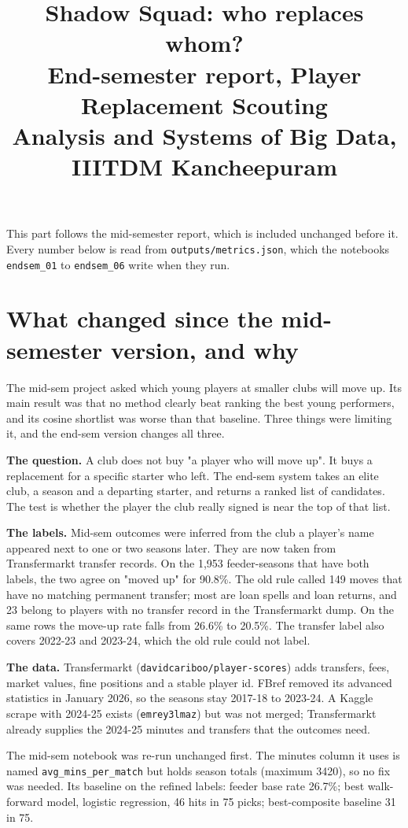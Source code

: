 \documentclass[11pt,a4paper]{article}
\title{Shadow Squad: who replaces whom?\\[4pt]\large End-semester report, Player Replacement Scouting\\Analysis and Systems of Big Data, IIITDM Kancheepuram}\date{}
\begin{document}
\sloppy\maketitle
\noindent This part follows the mid-semester report, which is included unchanged before it. Every number below is read from \texttt{outputs/metrics.json}, which the notebooks \texttt{endsem\_01} to \texttt{endsem\_06} write when they run.

\section{What changed since the mid-semester version, and why}
The mid-sem project asked which young players at smaller clubs will move up. Its main result was that no method clearly beat ranking the best young performers, and its cosine shortlist was worse than that baseline. Three things were limiting it, and the end-sem version changes all three.

\textbf{The question.} A club does not buy "a player who will move up". It buys a replacement for a specific starter who left. The end-sem system takes an elite club, a season and a departing starter, and returns a ranked list of candidates. The test is whether the player the club really signed is near the top of that list.

\textbf{The labels.} Mid-sem outcomes were inferred from the club a player's name appeared next to one or two seasons later. They are now taken from Transfermarkt transfer records. On the 1,953 feeder-seasons that have both labels, the two agree on "moved up" for 90.8\%. The old rule called 149 moves that have no matching permanent transfer; most are loan spells and loan returns, and 23 belong to players with no transfer record in the Transfermarkt dump. On the same rows the move-up rate falls from 26.6\% to 20.5\%. The transfer label also covers 2022-23 and 2023-24, which the old rule could not label.

\textbf{The data.} Transfermarkt (\texttt{davidcariboo/player-scores}) adds transfers, fees, market values, fine positions and a stable player id. FBref removed its advanced statistics in January 2026, so the seasons stay 2017-18 to 2023-24. A Kaggle scrape with 2024-25 exists (\texttt{emrey3lmaz}) but was not merged; Transfermarkt already supplies the 2024-25 minutes and transfers that the outcomes need.

The mid-sem notebook was re-run unchanged first. The minutes column it uses is named \texttt{avg\_mins\_per\_match} but holds season totals (maximum 3420), so no fix was needed. Its baseline on the refined labels: feeder base rate 26.7\%; best walk-forward model, logistic regression, 46 hits in 75 picks; best-composite baseline 31 in 75.
\end{document}

